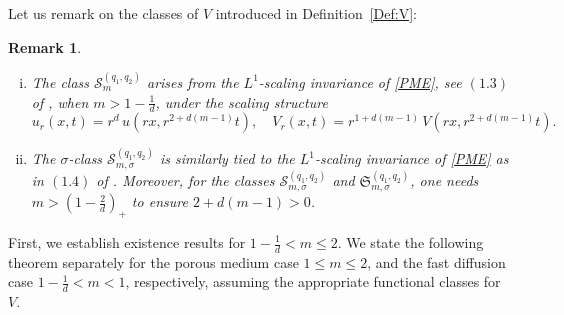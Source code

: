 \documentclass{amsart}
\newtheorem{remark}[defn]{Remark}
\numberwithin{equation}{section}
\begin{document}
Let us remark on the classes of \(V\) introduced in Definition~\ref{Def:V}:
\begin{remark}
\begin{enumerate}[(i)]
  \item The class \(\mathcal{S}_{m}^{(q_1, q_2)}\) arises from the \(L^1\)-scaling invariance of \eqref{PME}, see $(1.3)$ of \cite[Definition~1.1]{HKK01}, when \(m > 1 - \tfrac{1}{d}\), under the scaling structure
    \[
    u_{r}(x,t) = r^{d} \, u\left(rx, r^{2 + d(m-1)}t\right),
    \quad
    V_{r}(x,t) = r^{1 + d(m-1)} \, V\left(rx, r^{2 + d(m-1)}t\right).
    \]
  \item The \(\sigma\)-class \(\mathcal{S}_{m,\sigma}^{(q_1,q_2)}\) is similarly tied to the \(L^1\)-scaling invariance of \eqref{PME} as in $(1.4)$ of \cite[Definition~1.1]{HKK01}. Moreover, for the classes \(\mathcal{S}_{m,\sigma}^{(q_1,q_2)}\) and \(\mathfrak{S}_{m,\sigma}^{(q_1,q_2)}\), one needs \(m > \left(1-\tfrac{2}{d}\right)_+\) to ensure \(2 + d(m-1) > 0\).
\end{enumerate}
\end{remark}



First, we establish existence results for $1 - \frac{1}{d} < m \leq 2$.
We state the following theorem separately for the porous medium case $1\leq m \leq 2$, and the fast diffusion case $1-\frac{1}{d}< m <1$, respectively, assuming the appropriate functional classes for $V$.
\end{document}
